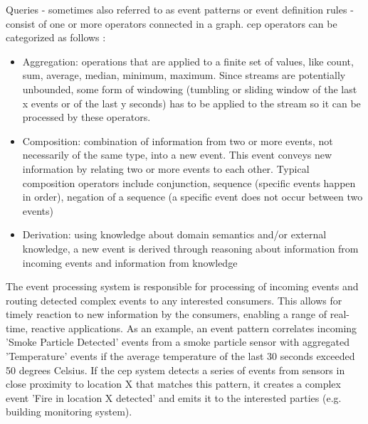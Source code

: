 Queries - sometimes also referred to as event patterns \cite{Luckham2011a} or event definition rules \cite{Cugola2013} - consist of one or more operators connected in a graph. \gls{cep} operators can be categorized as follows \cite{Freudenreich2015}:
\begin{itemize}
\item Aggregation: operations that are applied to a finite set of values, like count, sum, average, median, minimum, maximum. Since streams are potentially unbounded, some form of windowing (tumbling or sliding window of the last x events or of the last y seconds) has to be applied to the stream so it can be processed by these operators.
\item Composition: combination of information from two or more events, not necessarily of the same type, into a new event. This event conveys new information by relating two or more events to each other. Typical composition operators include conjunction, sequence (specific events happen in order), negation of a sequence (a specific event does not occur between two events) \cite{Eckert2009}
\item Derivation: using knowledge about domain semantics and/or external knowledge, a new event is derived through reasoning about information from incoming events and information from knowledge
\end{itemize}

The event processing system is responsible for processing of incoming events and routing detected complex events to any interested consumers.
This allows for timely reaction to new information by the consumers, enabling a range of real-time, reactive applications.
As an example, an event pattern correlates incoming 'Smoke Particle Detected' events from a smoke particle sensor with aggregated 'Temperature' events if the average temperature of the last 30 seconds exceeded 50 degrees Celsius. If the \gls{cep} system detects a series of events from sensors in close proximity to location X that matches this pattern, it creates a complex event 'Fire in location X detected' and emits it to the interested parties (e.g. building monitoring system). 

